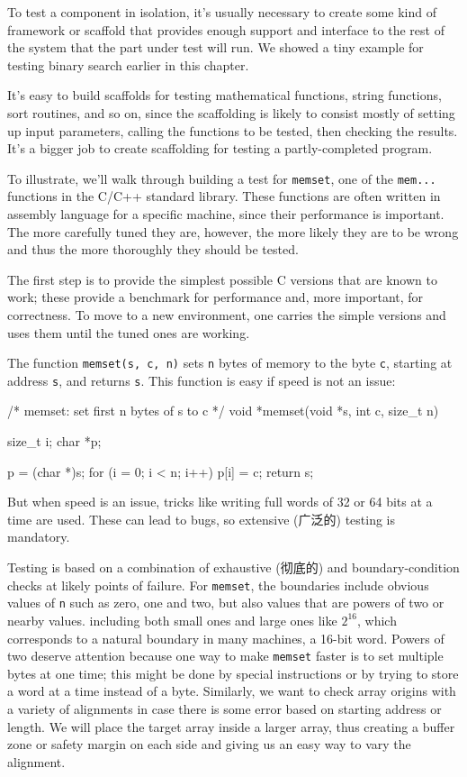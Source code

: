 To test a component in isolation, it's usually necessary to create some
kind of framework or scaffold that provides enough support and interface to
the rest of the system that the part under test will run. We showed a tiny
example for testing binary search earlier in this chapter.

It's easy to build scaffolds for testing mathematical functions, string
functions, sort routines, and so on, since the scaffolding is likely to
consist mostly of setting up input parameters, calling the functions to be
tested, then checking the results. It's a bigger job to create scaffolding
for testing a partly-completed program.

To illustrate, we'll walk through building a test for \texttt{memset}, one
of the \verb'mem...' functions in the C/C++ standard library. These
functions are often written in assembly language for a specific machine,
since their performance is important.  The more carefully tuned they are,
however, the more likely they are to be wrong and thus the more thoroughly
they should be tested.

The first step is to provide the simplest possible C versions that are
known to work; these provide a benchmark for performance and, more
important, for correctness. To move to a new environment, one carries the
simple versions and uses them until the tuned ones are working.

The function \verb'memset(s, c, n)' sets \verb'n' bytes of memory to the
byte \verb'c', starting at address \verb's', and returns \verb's'. This
function is easy if speed is not an issue:
\begin{wellcode}
    /* memset: set first n bytes of s to c */
    void *memset(void *s, int c, size_t n)
    {
        size_t  i;
        char    *p;

        p = (char *)s;
        for (i = 0; i < n; i++)
            p[i] = c;
        return s;
    }
\end{wellcode}
But when speed is an issue, tricks like writing full words of 32 or 64 bits
at a time are used. These can lead to bugs, so extensive (广泛的) testing
is mandatory.

Testing is based on a combination of exhaustive (彻底的) and
boundary-condition checks at likely points of failure. For \texttt{memset},
the boundaries include obvious values of \texttt{n} such as zero, one and
two, but also values that are powers of two or nearby values. including
both small ones and large ones like $2^{16}$, which corresponds to a natural
boundary in many machines, a 16-bit word. Powers of two deserve attention
because one way to make \texttt{memset} faster is to set multiple bytes at
one time; this might be done by special instructions or by trying to store
a word at a time instead of a byte.  Similarly, we want to check array
origins with a variety of alignments in case there is some error based on
starting address or length. We will place the target array inside a larger
array, thus creating a buffer zone or safety margin on each side and giving
us an easy way to vary the alignment.

